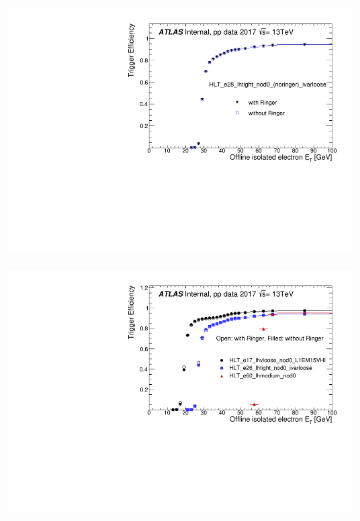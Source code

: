 \begin{figure}[h!tb]
  
  \begin{subfigure}[c]{.49\textwidth}
  \centering
  \includegraphics[width=\textwidth]{sections/03_operation/figures/efficiencies/eff_EGAM1_e28_ringer_and_noringer_2017_after_ts1_HLT_et.pdf}
  \caption{}
  \end{subfigure}
  \begin{subfigure}[c]{.49\textwidth}
  \centering
  \includegraphics[width=\textwidth]{sections/03_operation/figures/efficiencies/eff_EGAM1_e17_e26_e60_2017_before_and_after_ts1_et.pdf}
  \caption{}%
  \end{subfigure}\\
  \begin{subfigure}[c]{.49\textwidth}

\end{subfigure}
\end{figure}

